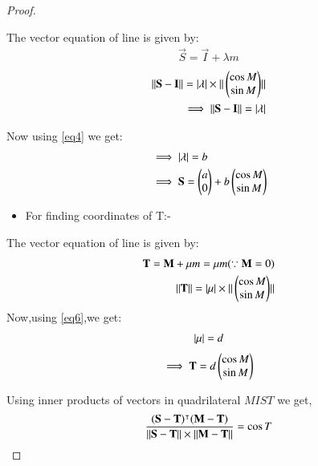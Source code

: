 \documentclass[journal,12pt,twocolumn]{IEEEtran}
\begin{document}
\begin{enumerate}
\begin{proof}
\begin{itemize}
\end{itemize}
The vector equation of line is given by:
\begin{align}
\vec{S}=\vec{I} + \lambda m \label{eq13}
\end{align}
\begin{align}
\Vert\mathbf{S}-\mathbf{I}\rVert = \vert\lambda\vert\times\Vert\begin{pmatrix}\cos M\\\sin M\end{pmatrix}\rVert 
\\
\implies \Vert\mathbf{S}-\mathbf{I}\rVert=\vert\lambda\vert
\end{align}
\item Now using \eqref{eq4} we get:
\begin{align}
&\implies \vert\lambda\vert=b \label{eq14}
\\
&\implies \mathbf{S}=\begin{pmatrix}a\\0\end{pmatrix} + b\begin{pmatrix}\cos M \\\sin M \end{pmatrix} 
\end{align}
\begin{itemize}
\item For finding coordinates of T:-
\end{itemize}
The vector equation of line is given by:
\begin{align}
\mathbf{T}=\mathbf{M} + \mu m =\mu m (\because \mathbf{M}=0) 
\\
\Vert\mathbf{T}\rVert=\vert\mu\vert\times\Vert\begin{pmatrix}\cos M\\\sin M\end{pmatrix}\rVert 
\end{align}
Now,using  \eqref{eq6},we get:
\begin{align}
\vert\mu\vert=d
\end{align}
\begin{align}
\implies \mathbf{T}=d \begin{pmatrix}\cos M\\\sin M \end{pmatrix} \label{eq15}
\end{align}
\item Using inner products of vectors in quadrilateral $MIST$ we get,
\begin{align}
\frac{\mathbf{(S-T)}^\intercal\mathbf{(M-T)}}{\Vert\mathbf{S-T}\rVert\times\Vert\mathbf{M-T}\rVert}=\cos T 
\end{align}


\end{proof}
\end{enumerate}
\end{document}
